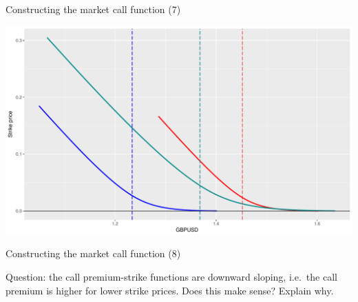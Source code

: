 \documentclass[ignorenonframetext,aspectratio=169]{beamer}
\begin{document}
\begin{frame}{Constructing the market call function (7)}

\includegraphics[width=0.9\linewidth]{2018_02_07_IMF_FXCourse_files/figure-beamer/unnamed-chunk-44-1}

\end{frame}

\begin{frame}{Constructing the market call function (8)}

Question: the call premium-strike functions are downward sloping,
i.e.~the call premium is higher for lower strike prices. Does this make
sense? Explain why.

\end{frame}
\end{document}
